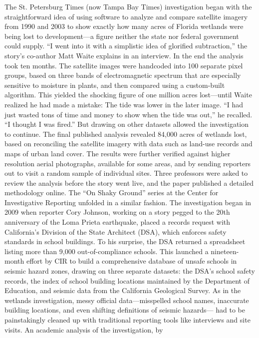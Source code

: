 \begin{itemize}
The St. Petersburg Times (now Tampa Bay Times) investigation began with
the straightforward idea of using software to analyze and compare satellite
imagery from 1990 and 2003 to show exactly how many acres of Florida
wetlands were being lost to development—a figure neither the state nor federal
government could supply. ``I went into it with a simplistic idea of glorified
subtraction,'' the story's co-author Matt Waite explains in an interview.
In the end the analysis took ten months. The satellite images were handcoded
into 100 separate pixel groups, based on three bands of electromagnetic
spectrum that are especially sensitive to moisture in plants, and then
compared using a custom-built algorithm. This yielded the shocking figure
of one million acres lost—until Waite realized he had made a mistake: The
tide was lower in the later image. ``I had just wasted tons of time and money
to show when the tide was out,'' he recalled. ``I thought I was fired.'' But
drawing on other datasets allowed the investigation to continue. The final
published analysis revealed 84,000 acres of wetlands lost, based on reconciling
the satellite imagery with data such as land-use records and maps of
urban land cover. The results were further verified against higher resolution
aerial photographs, available for some areas, and by sending reporters out
to visit a random sample of individual sites. Three professors were asked
to review the analysis before the story went live, and the paper published a
detailed methodology online.
The ``On Shaky Ground'' series at the Center for Investigative Reporting
unfolded in a similar fashion. The investigation began in 2009 when reporter
Cory Johnson, working on a story pegged to the 20th anniversary of the
Loma Prieta earthquake, placed a records request with California's Division
of the State Architect (DSA), which enforces safety standards in school
buildings. To his surprise, the DSA returned a spreadsheet listing more than 9,000 out-of-compliance schools. This launched a nineteen-month effort by
CIR to build a comprehensive database of unsafe schools in seismic hazard
zones, drawing on three separate datasets: the DSA's school safety records,
the index of school building locations maintained by the Department of
Education, and seismic data from the California Geological Survey. As in
the wetlands investigation, messy official data—misspelled school names,
inaccurate building locations, and even shifting definitions of seismic hazards—
had to be painstakingly cleaned up with traditional reporting tools
like interviews and site visits. An academic analysis of the investigation, by

\end{itemize}
